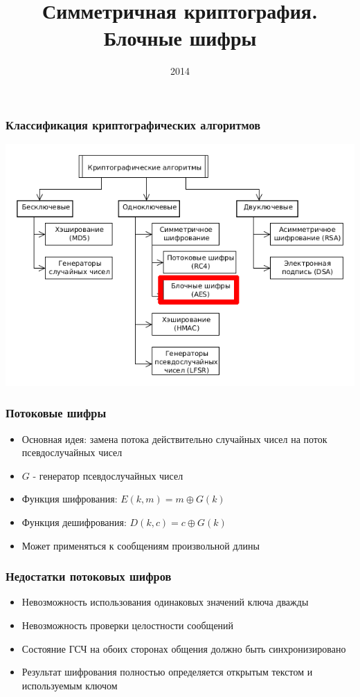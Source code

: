 \documentclass{beamer}
\title{Симметричная криптография. Блочные шифры}
\institute{ВГУ}
\date{2014}
\begin{document}
\frame{\titlepage}

\begin{frame}
  \frametitle{Классификация криптографических алгоритмов}

  \includegraphics[width=\linewidth]{./images/png/CA_classification_block.png}

\end{frame}

\begin{frame}
  \frametitle{Потоковые шифры}

  \begin{itemize}
    \itemsep 2em
    \item{Основная идея: замена потока действительно случайных чисел на 
      поток псевдослучайных чисел}
    \item{$G$ - генератор псевдослучайных чисел}
    \item{Функция шифрования: \newline
      $E(k,m)=m \oplus G(k)$}
    \item{Функция дешифрования: \newline
      $D(k,c)=c \oplus G(k)$}
    \item{Может применяться к сообщениям произвольной длины}
  \end{itemize}

\end{frame}


\begin{frame}
  \frametitle{Недостатки потоковых шифров}

  \begin{itemize}
    \itemsep 2em
    \item{Невозможность использования одинаковых значений ключа дважды}
    \item{Невозможность проверки целостности сообщений}
    \item{Состояние ГСЧ на обоих сторонах общения должно быть синхронизировано}
    \item{Результат шифрования полностью определяется открытым текстом и
      используемым ключом}
  \end{itemize}

\end{frame}
\end{document}
